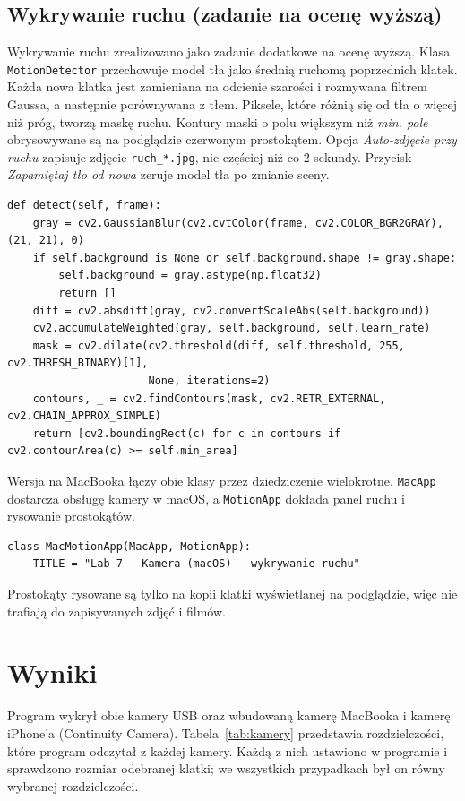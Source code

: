 \subsection{Wykrywanie ruchu (zadanie na ocenę wyższą)}
Wykrywanie ruchu zrealizowano jako zadanie dodatkowe na ocenę wyższą. Klasa
\texttt{MotionDetector} przechowuje model tła jako średnią ruchomą poprzednich klatek.
Każda nowa klatka jest zamieniana na odcienie szarości i rozmywana filtrem Gaussa, a następnie
porównywana z tłem. Piksele, które różnią się od tła o więcej niż próg, tworzą maskę ruchu.
Kontury maski o polu większym niż \emph{min. pole} obrysowywane są na podglądzie czerwonym
prostokątem. Opcja \emph{Auto-zdjęcie przy ruchu} zapisuje zdjęcie \texttt{ruch\_*.jpg},
nie częściej niż co 2 sekundy. Przycisk \emph{Zapamiętaj tło od nowa} zeruje model tła po
zmianie sceny.
\begin{lstlisting}
def detect(self, frame):
    gray = cv2.GaussianBlur(cv2.cvtColor(frame, cv2.COLOR_BGR2GRAY), (21, 21), 0)
    if self.background is None or self.background.shape != gray.shape:
        self.background = gray.astype(np.float32)
        return []
    diff = cv2.absdiff(gray, cv2.convertScaleAbs(self.background))
    cv2.accumulateWeighted(gray, self.background, self.learn_rate)
    mask = cv2.dilate(cv2.threshold(diff, self.threshold, 255, cv2.THRESH_BINARY)[1],
                      None, iterations=2)
    contours, _ = cv2.findContours(mask, cv2.RETR_EXTERNAL, cv2.CHAIN_APPROX_SIMPLE)
    return [cv2.boundingRect(c) for c in contours if cv2.contourArea(c) >= self.min_area]
\end{lstlisting}
Wersja na MacBooka łączy obie klasy przez dziedziczenie wielokrotne. \texttt{MacApp} dostarcza
obsługę kamery w macOS, a \texttt{MotionApp} dokłada panel ruchu i rysowanie prostokątów.
\begin{lstlisting}
class MacMotionApp(MacApp, MotionApp):
    TITLE = "Lab 7 - Kamera (macOS) - wykrywanie ruchu"
\end{lstlisting}
Prostokąty rysowane są tylko na kopii klatki wyświetlanej na podglądzie, więc nie trafiają do
zapisywanych zdjęć i filmów.

\section{Wyniki}
Program wykrył obie kamery USB oraz wbudowaną kamerę MacBooka i kamerę iPhone'a (Continuity
Camera). Tabela~\ref{tab:kamery} przedstawia rozdzielczości, które program odczytał z każdej kamery.
Każdą z nich ustawiono w programie i sprawdzono rozmiar odebranej klatki; we wszystkich
przypadkach był on równy wybranej rozdzielczości.

